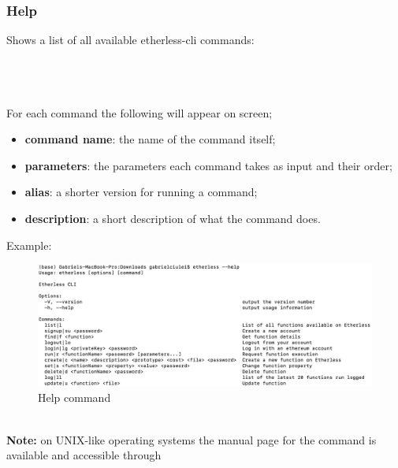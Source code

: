\subsubsection{Help}
Shows a list of all available etherless-cli commands:\\\\
\centerline {}\\\\
For each command the following will appear on screen;
\begin{itemize}
	\item \textbf{command name}: the name of the command itself;
	\item \textbf{parameters}: the parameters each command takes as input and their order;
	\item \textbf{alias}: a shorter version for running a command;
	\item \textbf{description}: a short description of what the command does.
\end{itemize}
Example:
\begin{figure}[h]
	\begin{center}
	\includegraphics[width=\textwidth]{res/img/help}
	\caption{Help command}
	\end{center}
\end{figure}
\\\textbf{Note:} on UNIX-like operating systems the manual page for the command is available and accessible through 
